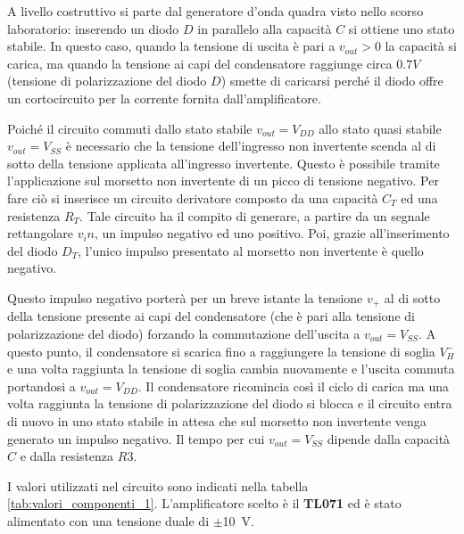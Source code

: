 A livello costruttivo si parte dal generatore d'onda quadra visto nello scorso laboratorio: inserendo un diodo $D$ in parallelo alla capacità $C$ si ottiene uno stato stabile. In questo caso, quando la tensione di uscita è pari a $v_{out}>0$ la capacità si carica, ma quando la tensione ai capi del condensatore raggiunge circa $0.7V$ (tensione di polarizzazione del diodo $D$) smette di caricarsi perché il diodo offre un cortocircuito per la corrente fornita dall'amplificatore. 

\noindent
Poiché il circuito commuti dallo stato stabile $v_{out}=V_{DD}$ allo stato quasi stabile $v_{out}=V_{SS}$ è necessario che la tensione dell'ingresso non invertente scenda al di sotto della tensione applicata all'ingresso invertente. Questo è possibile tramite l'applicazione sul morsetto non invertente di un picco di tensione negativo. Per fare ciò si inserisce un circuito derivatore composto da una capacità $C_T$ ed una resistenza $R_T$. Tale circuito ha il compito di generare, a partire da un segnale rettangolare $v_in$, un impulso negativo ed uno positivo. Poi, grazie all'inserimento del diodo $D_T$, l'unico impulso presentato al morsetto non invertente è quello negativo. 

\noindent
Questo impulso negativo porterà per un breve istante la tensione $v_+$ al di sotto della tensione presente ai capi del condensatore (che è pari alla tensione di polarizzazione del diodo) forzando la commutazione dell'uscita a $v_{out}=V_{SS}$. A questo punto, il condensatore si scarica fino a raggiungere la tensione di soglia $V_H^-$ e una volta raggiunta la tensione di soglia cambia nuovamente e l'uscita commuta portandosi a $v_{out}=V_{DD}$. Il condensatore ricomincia così il ciclo di carica ma una volta raggiunta la tensione di polarizzazione del diodo si blocca e il circuito entra di nuovo in uno stato stabile in attesa che sul morsetto non invertente venga generato un impulso negativo. Il tempo per cui $v_{out}=V_{SS}$ dipende dalla capacità $C$ e dalla resistenza $R3$.

I valori utilizzati nel circuito sono indicati nella tabella \ref{tab:valori_componenti_1}. L'amplificatore scelto è il \textbf{TL071} ed è stato alimentato con una tensione duale di $\pm$\SI{10}{\volt}.

